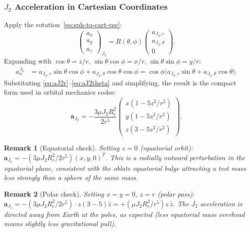 \documentclass[11pt]{article}
\newtheorem{remark}{Remark}
\begin{document}
\subsubsection{$J_2$ Acceleration in Cartesian Coordinates}

Apply the rotation~\eqref{eq:sph-to-cart-vec}:
\begin{equation}
  \begin{pmatrix}a_x\\a_y\\a_z\end{pmatrix}_{J_2}
  = R(\theta,\phi)
  \begin{pmatrix}a_{J_2,r}\\a_{J_2,\theta}\\0\end{pmatrix}.
  \label{eq:aJ2-rotate}
\end{equation}
Expanding with $\cos\theta = z/r$,
$\sin\theta\cos\phi = x/r$, $\sin\theta\sin\phi = y/r$:
\begin{align}
  a_x^{J_2} &= a_{J_2,r}\sin\theta\cos\phi + a_{J_2,\theta}\cos\theta\cos\phi
             = \cos\phi\bigl(a_{J_2,r}\sin\theta + a_{J_2,\theta}\cos\theta\bigr).
  \label{eq:aJ2x-expand}
\end{align}
Substituting \eqref{eq:aJ2r}--\eqref{eq:aJ2theta} and simplifying, the result
is the compact form used in orbital mechanics codes:
\begin{equation}
  \boxed{
  \mathbf{a}_{J_2}
  = -\frac{3\mu J_2 R_e^2}{2r^5}
    \begin{pmatrix}
      x\!\left(1 - 5z^2/r^2\right)\\[2pt]
      y\!\left(1 - 5z^2/r^2\right)\\[2pt]
      z\!\left(3 - 5z^2/r^2\right)
    \end{pmatrix}.
  }
  \label{eq:aJ2-compact}
\end{equation}

\begin{remark}[Equatorial check]
  Setting $z=0$ (equatorial orbit): $\mathbf{a}_{J_2} = -(3\mu J_2 R_e^2/2r^5)
  (x,y,0)^T$.  This is a radially outward perturbation in the equatorial
  plane, consistent with the oblate equatorial bulge attracting a test mass
  less strongly than a sphere of the same mass.
\end{remark}

\begin{remark}[Polar check]
  Setting $x=y=0$, $z=r$ (polar pass): $\mathbf{a}_{J_2} = -(3\mu J_2 R_e^2/2r^5)
  \cdot z(3-5) \hat{z} = +(\mu J_2 R_e^2/r^5)z\,\hat{z}$.  The $J_2$
  acceleration is directed \emph{away} from Earth at the poles, as expected
  (less equatorial mass overhead means slightly less gravitational pull).
\end{remark}
\end{document}
